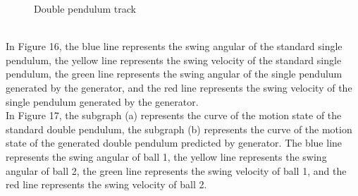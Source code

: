 \documentclass[11pt,a4paper]{article}
\begin{document}
\begin{figure}[ht!]
\centering
{}
\quad
{}
\caption{Double pendulum track}
\label{fig: Double pendulum track}
\end{figure}
\\
In Figure 16, the blue line represents the swing angular of the standard single pendulum, the yellow line represents the swing velocity of the standard single pendulum, the green line represents the swing angular of the single pendulum generated by the generator, and the red line represents the swing velocity of the single pendulum generated by the generator.
\\
\newline
In Figure 17, the subgraph (a) represents the curve of the motion state of the standard double pendulum, the subgraph (b) represents the curve of the motion state of the generated double pendulum predicted by generator. The blue line represents the swing angular of ball 1, the yellow line represents the swing angular of ball 2, the green line represents the swing velocity of ball 1, and the red line represents the swing velocity of ball 2.

\newpage
\end{document}
